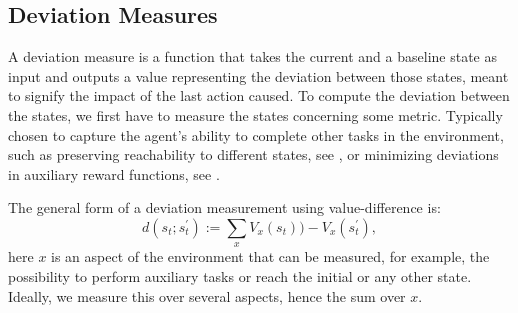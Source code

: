 \documentclass[12pt,A4]{report}
\theoremstyle{definition}
\begin{document}

\subsection{Deviation Measures}
A deviation measure is a function that takes the current and a baseline state as input and outputs a value representing the deviation between those states, meant to signify the impact of the last action caused. To compute the deviation between the states, we first have to measure the states concerning some metric. Typically chosen to capture the agent's ability to complete other tasks in the environment, such as preserving reachability to different states, see \citet{Krakovna19}, or minimizing deviations in auxiliary reward functions, see \citet{Turner19}. 

The general form of a deviation measurement using value-difference is:
  \[d(s_t;s^{\prime}_t) := \sum_x V_x(s_t)) - V_x(s^{\prime}_t) ,\]
here $x$ is an aspect of the environment that can be measured, for example, the possibility to perform auxiliary tasks or reach the initial or any other state. Ideally, we measure this over several aspects, hence the sum over $x$.

\end{document}
